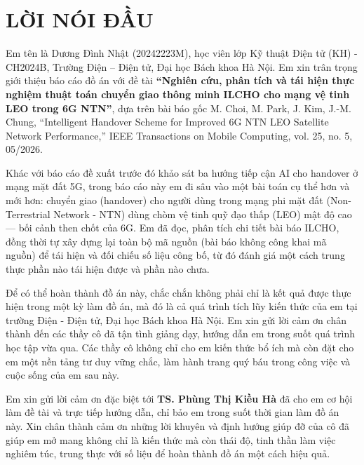 \section*{LỜI NÓI ĐẦU}
\thispagestyle{empty}
Em tên là Dương Đình Nhật (20242223M), học viên lớp Kỹ thuật Điện tử (KH) - CH2024B, Trường Điện – Điện tử, Đại học Bách khoa Hà Nội. Em xin trân trọng giới thiệu báo cáo đồ án với đề tài \textbf{“Nghiên cứu, phân tích và tái hiện thực nghiệm thuật toán chuyển giao thông minh ILCHO cho mạng vệ tinh LEO trong 6G NTN”}, dựa trên bài báo gốc M. Choi, M. Park, J. Kim, J.-M. Chung, ``Intelligent Handover Scheme for Improved 6G NTN LEO Satellite Network Performance,'' IEEE Transactions on Mobile Computing, vol. 25, no. 5, 05/2026.

Khác với báo cáo đề xuất trước đó khảo sát ba hướng tiếp cận AI cho handover ở mạng mặt đất 5G, trong báo cáo này em đi sâu vào một bài toán cụ thể hơn và mới hơn: chuyển giao (handover) cho người dùng trong mạng phi mặt đất (Non-Terrestrial Network - NTN) dùng chòm vệ tinh quỹ đạo thấp (LEO) mật độ cao — bối cảnh then chốt của 6G. Em đã đọc, phân tích chi tiết bài báo ILCHO, đồng thời tự xây dựng lại toàn bộ mã nguồn (bài báo không công khai mã nguồn) để tái hiện và đối chiếu số liệu công bố, từ đó đánh giá một cách trung thực phần nào tái hiện được và phần nào chưa.

Để có thể hoàn thành đồ án này, chắc chắn không phải chỉ là kết quả được thực hiện trong một kỳ làm đồ án, mà đó là cả quá trình tích lũy kiến thức của em tại trường Điện - Điện tử, Đại học Bách khoa Hà Nội. Em xin gửi lời cảm ơn chân thành đến các thầy cô đã tận tình giảng dạy, hướng dẫn em trong suốt quá trình học tập vừa qua. Các thầy cô không chỉ cho em kiến thức bổ ích mà còn đặt cho em một nền tảng tư duy vững chắc, làm hành trang quý báu trong công việc và cuộc sống của em sau này.

Em xin gửi lời cảm ơn đặc biệt tới \textbf{TS. Phùng Thị Kiều Hà} đã cho em cơ hội làm đề tài và trực tiếp hướng dẫn, chỉ bảo em trong suốt thời gian làm đồ án này. Xin chân thành cảm ơn những lời khuyên và định hướng giúp đỡ của cô đã giúp em mở mang không chỉ là kiến thức mà còn thái độ, tinh thần làm việc nghiêm túc, trung thực với số liệu để hoàn thành đồ án một cách hiệu quả.

\cleardoublepage

